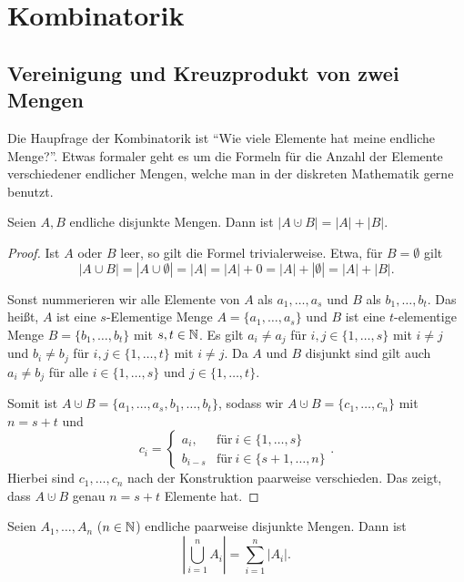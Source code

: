 \chapter{Kombinatorik} 

\section{Vereinigung und Kreuzprodukt von zwei Mengen} 

\begin{bem}
	Die Haupfrage der Kombinatorik ist ``Wie viele Elemente hat meine endliche Menge?''. Etwas formaler geht es um die Formeln für die Anzahl der Elemente verschiedener endlicher Mengen, welche man in der diskreten Mathematik gerne benutzt. 
\end{bem} 

\begin{lem} \label{lem:vereinigung:zwei}
	Seien $A, B$ endliche disjunkte Mengen. Dann ist $|A \cupdot B| = |A| + |B|$. 
\end{lem} 

\begin{proof}
	Ist $A$ oder $B$ leer, so gilt die Formel trivialerweise. Etwa, für $B = \emptyset$ gilt 
	\[
		|A \cup B| = | A \cup \emptyset| = |A| = |A| + 0 = |A| + | \emptyset| = |A| + |B|. 
	\]
	
	 Sonst nummerieren wir alle Elemente von $A$ als $a_1,\ldots,a_s$ und $B$ als $b_1,\ldots,b_t$. Das heißt, $A$ ist eine $s$-Elementige Menge $A = \{a_1,\ldots,a_s\}$ und $B$ ist eine $t$-elementige Menge $B = \{b_1,\ldots,b_t\}$ mit $s,t \in \mathbb{N}$. Es gilt $a_i \ne a_j$ für $i,j \in \{1,\ldots,s\}$ mit $i \ne j$   und $b_i \ne b_j$ für  $i,j \in \{1,\ldots,t\}$ mit $i \ne j$. Da $A$ und $B$ disjunkt sind gilt auch $a_i \ne b_j$ für alle $i \in \{1,\ldots,s\}$ und $j \in \{1,\ldots,t\}$. 
	 
	 Somit ist 
	 $A \cupdot B = \{a_1,\ldots,a_s,b_1,\ldots,b_t\}$, sodass wir $A \cupdot B = \{c_1,\ldots,c_n\}$ mit $n = s + t$ und 
	 \[
	 	c_i = \begin{cases}
	 		 a_i, & \text{für} \ i \in\{1,\ldots,s\}
	 		 \\b_{i-s}  &  \text{für} \ i \in \{s+1,\ldots,n\}
	 		\end{cases}.
 	\] 
 	Hierbei sind $c_1,\ldots,c_n$ nach der Konstruktion paarweise verschieden. Das zeigt, dass $A \cupdot B$ genau $n = s+t$ Elemente hat. 
\end{proof}

\begin{lem} \label{lem:disjunkte:vereinigung}
	Seien $A_1,\ldots,A_n$ ($n \in \mathbb{N}$) endliche paarweise disjunkte Mengen. Dann ist 
	\[
		\left| \bigcup_{i=1}^n A_i \right| = \sum_{i=1}^n |A_i|. 
	\]
\end{lem} 

